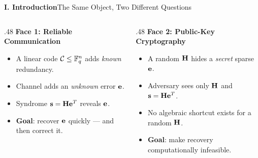 \begin{frame}{\textbf{I. Introduction}}{The Same Object, Two Different Questions}
\small
\begin{columns}[T,onlytextwidth]
\begin{column}{.48\textwidth}
\textcolor{TealDarkCyan}{\textbf{Face 1: Reliable Communication}}
\begin{itemize}
  \item A linear code $\mathcal{C}\le\mathbb{F}_q^n$ adds \emph{known} redundancy.
  \item Channel adds an \emph{unknown} error $\mathbf{e}$.
  \item Syndrome $\mathbf{s} = \mathbf{H}\mathbf{e}^T$ reveals $\mathbf{e}$.
  \item \textbf{Goal}: recover $\mathbf{e}$ quickly — and then correct it.
\end{itemize}
\end{column}
\begin{column}{.48\textwidth}
\textcolor{TealDarkCyan}{\textbf{Face 2: Public-Key Cryptography}}
\begin{itemize}
  \item A random $\mathbf{H}$ hides a \emph{secret} sparse $\mathbf{e}$.
  \item Adversary sees only $\mathbf{H}$ and $\mathbf{s} = \mathbf{H}\mathbf{e}^T$.
  \item No algebraic shortcut exists for a random $\mathbf{H}$.
  \item \textbf{Goal}: make recovery computationally infeasible.
\end{itemize}
\end{column}
\end{columns}
\bigskip
\begin{center}
\end{center}
\end{frame}

